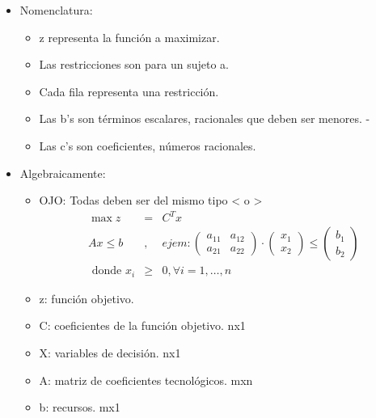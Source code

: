 \documentclass[12pt, twoside, openright]{report} %
\begin{document}
\begin{itemize}
	\item Nomenclatura:

	      \begin{itemize}
		      \item z representa la función a maximizar.
		      \item Las restricciones son para un sujeto a.
		      \item Cada fila representa una restricción.
		      \item Las b's son términos escalares, racionales que deben ser menores. -
		      \item Las c's son coeficientes, números racionales.
	      \end{itemize}
\end{itemize}

\begin{itemize}
	\item Algebraicamente:

	      \begin{itemize}
		      \item OJO: Todas deben ser del mismo tipo \textless{} o \textgreater{}
		            \begin{eqnarray*}
			            \max z &=& C^{T}x \\
			            Ax\leq b&,& ejem: \begin{pmatrix}  a_{11} & a_{12} \\
				            a_{21} & a_{22}\end{pmatrix} \cdot \begin{pmatrix}  x_1 \\
				            x_2\end{pmatrix} \leq \begin{pmatrix}  b_1 \\
				            b_2\end{pmatrix}\\
			            \text { donde } x_{i} &\geq& 0, \forall i=1, \ldots, n
		            \end{eqnarray*}
		      \item z: función objetivo.
		      \item C: coeficientes de la función objetivo. nx1
		      \item X: variables de decisión. nx1
		      \item A: matriz de coeficientes tecnológicos. mxn
		      \item b: recursos. mx1
	      \end{itemize}
\end{itemize}
\end{document}
